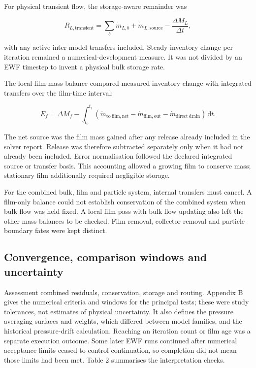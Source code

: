 For physical transient flow, the storage-aware remainder was

\[R_{L,\mathrm{transient}}=\sum_b\dot m_{L,b}+\dot m_{L,\mathrm{source}}-\frac{\Delta M_L}{\Delta t},\]

with any active inter-model transfers included. Steady inventory change per iteration remained a numerical-development measure. It was not divided by an EWF timestep to invent a physical bulk storage rate.

The local film mass balance compared measured inventory change with integrated transfers over the film-time interval:

\[E_f=\Delta M_f-\int_{t_0}^{t_1}\left(\dot m_{\mathrm{to\ film,net}}-\dot m_{\mathrm{film,out}}-\dot m_{\mathrm{direct\ drain}}\right)\,\mathrm dt.\]

The net source was the film mass gained after any release already included in the solver report. Release was therefore subtracted separately only when it had not already been included. Error normalisation followed the declared integrated source or transfer basis. This accounting allowed a growing film to conserve mass; stationary film additionally required negligible storage.

For the combined bulk, film and particle system, internal transfers must cancel. A film-only balance could not establish conservation of the combined system when bulk flow was held fixed. A local film pass with bulk flow updating also left the other mass balances to be checked. Film removal, collector removal and particle boundary fates were kept distinct.

\subsection{Convergence, comparison windows and uncertainty}

Assessment combined residuals, conservation, storage and routing. Appendix B gives the numerical criteria and windows for the principal tests; these were study tolerances, not estimates of physical uncertainty. It also defines the pressure averaging surfaces and weights, which differed between model families, and the historical pressure-drift calculation. Reaching an iteration count or film age was a separate execution outcome. Some later EWF runs continued after numerical acceptance limits ceased to control continuation, so completion did not mean those limits had been met. Table 2 summarises the interpretation checks.

